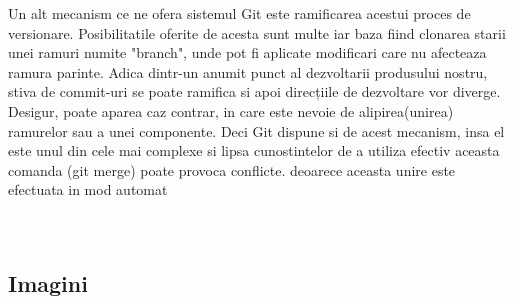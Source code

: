 Un alt mecanism ce ne ofera sistemul Git este ramificarea acestui proces de versionare. Posibilitatile oferite de acesta sunt multe iar baza fiind clonarea starii unei ramuri numite "branch", unde pot fi aplicate modificari care nu afecteaza ramura parinte. Adica dintr-un anumit punct al dezvoltarii produsului nostru, stiva de commit-uri se poate ramifica si apoi direcțiile de dezvoltare vor diverge. Desigur, poate aparea caz contrar, in care este nevoie de alipirea(unirea) ramurelor sau a unei componente. Deci Git dispune si de acest mecanism, insa el este unul din cele mai complexe si lipsa cunostintelor de a utiliza efectiv aceasta comanda (git merge) poate provoca conflicte. deoarece aceasta unire este efectuata in mod automat  
\\
\\
\\



\subsection{Imagini}

